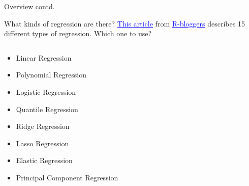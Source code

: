 \documentclass[11pt]{beamer}
\begin{document}
\begin{frame}{
	\begin{minipage}[t]{0.55\textwidth}
		Overview contd.
	\end{minipage}
	\hfill
	\begin{minipage}[t]{0.35\textwidth}
		\flushright
	\end{minipage}
}{}
What kinds of regression are there? \href{https://www.r-bloggers.com/15-types-of-regression-you-should-know/?utm\_source=feedburner\&utm\_medium=email\&utm\_campaign=Feed\%3A+RBloggers+\%28R+bloggers\%29}{\textcolor{blue}{\underline{This article}}} from \href{https://www.r-bloggers.com/}{\textcolor{blue}{\underline{R-bloggers}}} describes 15 different types of regression. Which one to use?
\begin{columns}
	\begin{column}[t]{0.45\textwidth}
		\begin{itemize}
			\item Linear Regression
			\item Polynomial Regression
			\item Logistic Regression
			\item Quantile Regression
			\item Ridge Regression
			\item Lasso Regression
			\item Elastic Regression
			\item Principal Component Regression

\end{itemize}
\end{column}
\end{columns}
\end{frame}
\end{document}
